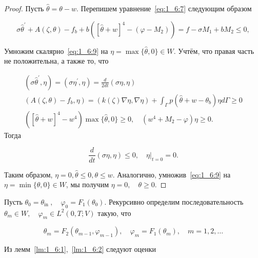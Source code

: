 \begin{proof}
    Пусть $\widehat{\theta}=\theta-w$.
    Перепишем уравнение~\eqref{eq:1_6:7} следующим образом

    \begin{equation}
        \label{eq:1_6:9}
        \sigma \widehat{\theta}^{\prime}+A(\zeta, \theta)-f_{b}
        +b\left([\widehat{\theta}+w]^{4}
        -\left(\varphi-M_{2}\right)\right)=f-\sigma M_{1}+b M_{2} \leq 0,
    \end{equation}

    Умножим скалярно~\eqref{eq:1_6:9} на $\eta=\max \{\widehat{\theta}, 0\} \in W$.
    Учтём, что правая часть не положительна, а также то, что

    \[
        \begin{gathered}
            \left(\sigma \widehat{\theta}^{\prime}, \eta\right)
            =\left(\sigma \eta^{\prime}, \eta\right)=\frac{d}{2 d t}(\sigma \eta, \eta) \\
            \left(A(\zeta, \theta)-f_{b}, \eta\right)
            =(k(\zeta) \nabla \eta, \nabla \eta)
            +\int_{\Gamma} p\left(\widehat{\theta}
            +w-\theta_{b}\right) \eta d \Gamma \geq 0 \\
            \left([\widehat{\theta}+w]^{4}-w^{4}\right) \max \{\widehat{\theta}, 0\} \geq 0,
            \quad\left(w^{4}+M_{2}-\varphi\right) \eta \geq 0.
        \end{gathered}
    \]
    Тогда

    \[
        \frac{d}{d t}(\sigma \eta, \eta) \leq 0,\left.\quad \eta\right|_{t=0}=0.
    \]


    Таким образом, $\eta=0, \widehat{\theta} \leq 0, \theta \leq w$.
    Аналогично, умножив~\eqref{eq:1_6:9} на $\eta=\min \{\theta, 0\} \in W$,
    мы получим $\eta=0, \quad \theta \geq 0$.
\end{proof}

Пусть $\theta_{0}=\theta_{\text {in }}, \quad \varphi_{0}=F_{1}\left(\theta_{0}\right)$.
Рекурсивно определим последовательность
$\theta_{m} \in W, \quad \varphi_{m} \in L^{2}(0, T ; V)$ такую, что

\begin{equation}
    \label{eq:1_6:10}
    \theta_{m}=F_{2}\left(\theta_{m-1}, \varphi_{m-1}\right),
    \quad \varphi_{m}=F_{1}\left(\theta_{m}\right), \quad m=1,2, \ldots
\end{equation}

Из лемм~\ref{lm:1_6:1},~\ref{lm:1_6:2} следуют оценки

